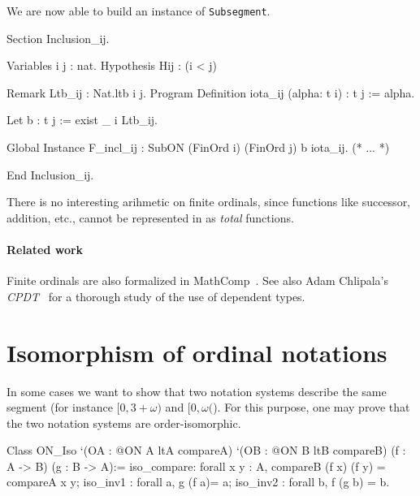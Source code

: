 
We are now able to build an instance of \texttt{Subsegment}. 

\begin{Coqsrc}
Section Inclusion_ij.

  Variables i j : nat.
  Hypothesis Hij : (i < j)%

   Remark Ltb_ij : Nat.ltb i j.
   Program Definition iota_ij  (alpha: t i) : t j :=  alpha.
 
   Let b : t j := exist _ i Ltb_ij.
   
   Global Instance F_incl_ij  : SubON  (FinOrd i) (FinOrd j) b iota_ij.
  (* ... *)

  End Inclusion_ij.

\end{Coqsrc}
         



\begin{remark}
 There is no interesting arihmetic on finite ordinals, since functions like successor, addition, etc.,  cannot be represented in \coq{} as \emph{total} functions.
\end{remark}

\paragraph{Related work}
Finite ordinals are also formalized in MathComp~\cite{SSR}.  See also Adam Chlipala's \emph{CPDT}~\cite{chlipalacpdt2011} for a thorough study of the use of dependent types.


\section{Isomorphism of ordinal notations}


In some cases we want to show that two notation systems describe the same segment (for instance $[0,3+\omega)$ and $[0,\omega($). For this purpose, one may prove that the two notation systems are order-isomorphic.

\label{types:ON-iso} 
\begin{Coqsrc}
Class  ON_Iso 
       `(OA : @ON A ltA compareA)
       `(OB : @ON B ltB  compareB)
       (f : A -> B)
       (g : B -> A):=
  {
  iso_compare: forall x y : A, 
      compareB (f x) (f y) = compareA x y;
  iso_inv1 : forall a, g (f a)= a;
  iso_inv2 : forall b, f (g b) = b}.
\end{Coqsrc}

